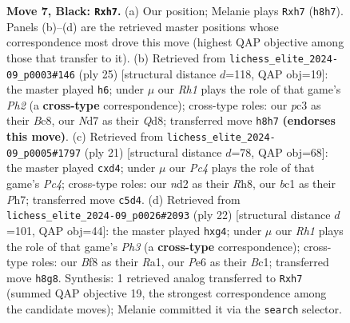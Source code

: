 \documentclass[11pt]{article}
\begin{document}
\begin{figure}[p]
\caption{\textbf{Move 7, Black: \texttt{Rxh7}.} (a) Our position; Melanie plays \texttt{Rxh7} (\texttt{h8h7}). Panels (b)--(d) are the retrieved master positions whose correspondence most drove this move (highest QAP objective among those that transfer to it). (b) Retrieved from \texttt{lichess\_elite\_2024-09\_p0003\#146} (ply 25) [structural distance $d$=118, QAP obj=19]: the master played \texttt{h6}; under $\mu$ our \emph{Rh1} plays the role of that game's \emph{Ph2} (a \textbf{cross-type} correspondence); cross-type roles: our \emph{p}c3 as their \emph{B}c8, our \emph{N}d7 as their \emph{Q}d8; transferred move \texttt{h8h7} \textbf{(endorses this move)}. (c) Retrieved from \texttt{lichess\_elite\_2024-09\_p0005\#1797} (ply 21) [structural distance $d$=78, QAP obj=68]: the master played \texttt{cxd4}; under $\mu$ our \emph{Pc4} plays the role of that game's \emph{Pc4}; cross-type roles: our \emph{n}d2 as their \emph{R}h8, our \emph{b}c1 as their \emph{P}h7; transferred move \texttt{c5d4}. (d) Retrieved from \texttt{lichess\_elite\_2024-09\_p0026\#2093} (ply 22) [structural distance $d$=101, QAP obj=44]: the master played \texttt{hxg4}; under $\mu$ our \emph{Rh1} plays the role of that game's \emph{Ph3} (a \textbf{cross-type} correspondence); cross-type roles: our \emph{B}f8 as their \emph{R}a1, our \emph{P}e6 as their \emph{B}c1; transferred move \texttt{h8g8}. Synthesis: 1 retrieved analog transferred to \texttt{Rxh7} (summed QAP objective 19, the strongest correspondence among the candidate moves); Melanie committed it via the \texttt{search} selector.}
\label{fig:thought-m13}
\end{figure}

\clearpage
\end{document}
